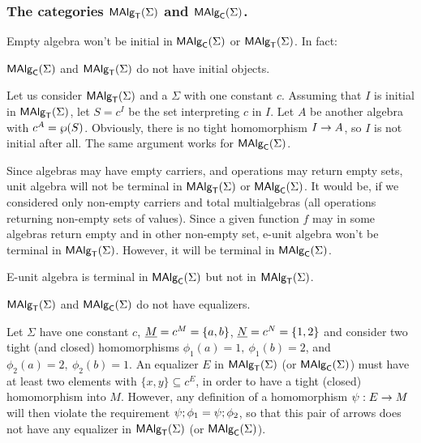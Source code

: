 \documentclass[10pt]{article}
\begin{document}
\subsubsection{The categories $\mbox{\rm\sf MAlg}_{\sf T}(\Sigma)$ and $\mbox{\rm\sf MAlg}_{\sf C}(\Sigma)$.}

Empty algebra won't be initial in $\mbox{\rm\sf MAlg}_{\sf C}(\Sigma)$ or $\mbox{\rm\sf MAlg}_{\sf T}(\Sigma)$. In fact:


\begin{Fact}
\label{le:noinit}
$\mbox{\rm\sf MAlg}_{\sf C}(\Sigma)$ and $\mbox{\rm\sf MAlg}_{\sf T}(\Sigma)$ do not have initial objects.
\end{Fact}

\begin{Proof}
Let us consider $\mbox{\rm\sf MAlg}_{\sf T}(\Sigma)$ and a $\Sigma$ with one constant $c$. Assuming
that $I$ is initial in $\mbox{\rm\sf MAlg}_{\sf T}(\Sigma)$, let $S=c^I$ be the set interpreting
$c$ in $I$.  Let $A$ be another algebra with
$c^A=\wp(S)$. Obviously, there is no tight homomorphism $I\rightarrow A$,
so $I$ is not initial after all. The same argument works for $\mbox{\rm\sf MAlg}_{\sf C}(\Sigma)$.
\end{Proof}

\noindent  
Since algebras may have empty carriers, and operations may return
empty sets, unit algebra will not be terminal in $\mbox{\rm\sf MAlg}_{\sf T}(\Sigma)$ or
$\mbox{\rm\sf MAlg}_{\sf C}(\Sigma)$. It would be, if we considered only non-empty carriers and
total multialgebras (all operations returning non-empty sets of
values). Since a given function $f$ may in some algebras return empty
and in other non-empty set, e-unit algebra won't be terminal in
$\mbox{\rm\sf MAlg}_{\sf T}(\Sigma)$.  However, it will be terminal in $\mbox{\rm\sf MAlg}_{\sf C}(\Sigma)$.

\begin{Fact}
E-unit algebra is terminal in $\mbox{\rm\sf MAlg}_{\sf C}(\Sigma)$ but not in  $\mbox{\rm\sf MAlg}_{\sf T}(\Sigma)$.
\end{Fact}


\begin{Fact}
$\mbox{\rm\sf MAlg}_{\sf T}(\Sigma)$ and $\mbox{\rm\sf MAlg}_{\sf C}(\Sigma)$ do not have equalizers.
\end{Fact}

\begin{Proof}
Let $\Sigma$ have one constant $c$, $\underline {M}=c^M=\{a,b\}$, $\underline {N}=c^N=\{1,2\}$ and consider two tight (and closed) homomorphisms
$\phi_1(a)=1,\ \phi_1(b)=2$, and $\phi_2(a)=2,\ \phi_2(b)=1$. An
equalizer $E$ in $\mbox{\rm\sf MAlg}_{\sf T}(\Sigma)$ (or $\mbox{\rm\sf MAlg}_{\sf C}(\Sigma)$) must have at least two elements
with $\{x,y\}\subseteq c^E$, in order to have a tight (closed)
homomorphism into $M$. However, any definition of a homomorphism
$\psi:E\rightarrow M$ will then violate the requirement
$\psi;\phi_1=\psi;\phi_2$, so that this pair of arrows
does not have any equalizer in $\mbox{\rm\sf MAlg}_{\sf T}(\Sigma)$ (or $\mbox{\rm\sf MAlg}_{\sf C}(\Sigma)$).
\end{Proof}
\end{document}
